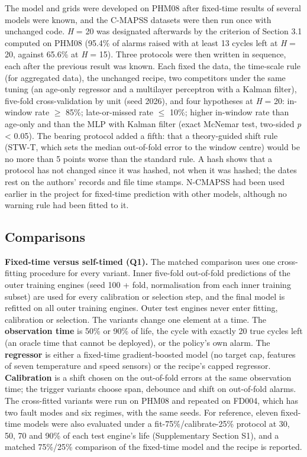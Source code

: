 \documentclass[a4paper,fleqn,doubleblind]{cas-dc}
\begin{document}
The model and grids were developed on PHM08 after fixed-time results of several models were known, and the C-MAPSS datasets were then run once with unchanged code. \textit{H} = 20 was designated afterwards by the criterion of Section 3.1 computed on PHM08 (95.4\% of alarms raised with at least 13 cycles left at \textit{H} = 20, against 65.6\% at \textit{H} = 15). Three protocols were then written in sequence, each after the previous result was known. Each fixed the data, the time-scale rule (for aggregated data), the unchanged recipe, two competitors under the same tuning (an age-only regressor and a multilayer perceptron with a Kalman filter), five-fold cross-validation by unit (seed 2026), and four hypotheses at \textit{H} = 20: in-window rate $\ge$ 85\%; late-or-missed rate $\le$ 10\%; higher in-window rate than age-only and than the MLP with Kalman filter (exact McNemar test, two-sided \textit{p} < 0.05). The bearing protocol added a fifth: that a theory-guided shift rule (STW-T, which sets the median out-of-fold error to the window centre) would be no more than 5 points worse than the standard rule. A hash shows that a protocol has not changed since it was hashed, not when it was hashed; the dates rest on the authors' records and file time stamps. N-CMAPSS had been used earlier in the project for fixed-time prediction with other models, although no warning rule had been fitted to it.

\subsection{Comparisons}

\textbf{Fixed-time versus self-timed (Q1).} The matched comparison uses one cross-fitting procedure for every variant. Inner five-fold out-of-fold predictions of the outer training engines (seed 100 + fold, normalisation from each inner training subset) are used for every calibration or selection step, and the final model is refitted on all outer training engines. Outer test engines never enter fitting, calibration or selection. The variants change one element at a time. The \textbf{observation time} is 50\% or 90\% of life, the cycle with exactly 20 true cycles left (an oracle time that cannot be deployed), or the policy's own alarm. The \textbf{regressor} is either a fixed-time gradient-boosted model (no target cap, features of seven temperature and speed sensors) or the recipe's capped regressor. \textbf{Calibration} is a shift chosen on the out-of-fold errors at the same observation time; the trigger variants choose span, debounce and shift on out-of-fold alarms. The cross-fitted variants were run on PHM08 and repeated on FD004, which has two fault modes and six regimes, with the same seeds. For reference, eleven fixed-time models were also evaluated under a fit-75\%/calibrate-25\% protocol at 30, 50, 70 and 90\% of each test engine's life (Supplementary Section S1), and a matched 75\%/25\% comparison of the fixed-time model and the recipe is reported.
\end{document}
